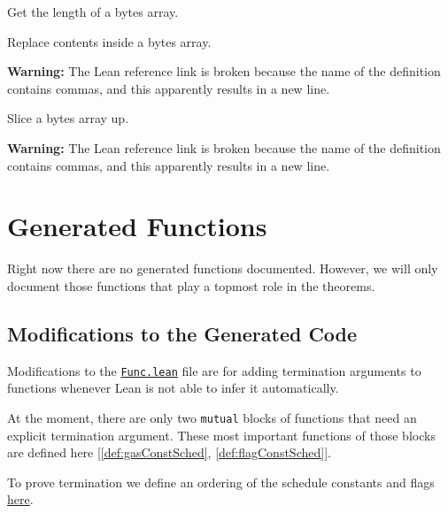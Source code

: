 \begin{definition}[lengthBytes]\label{def:lengthBytes}
\leanok{}
Get the length of a bytes array.
\end{definition}

\begin{definition}[replaceAtBytes]\label{def:replaceAtBytes}
\leanok{}
Replace contents inside a bytes array.

\textbf{Warning:} The Lean reference link is broken because the name of the
definition contains commas, and this apparently results in a new line.
\end{definition}

\begin{definition}[substrBytes]\label{def:substrBytes}
\leanok{}
Slice a bytes array up.

\textbf{Warning:} The Lean reference link is broken because the name of the
definition contains commas, and this apparently results in a new line.
\end{definition}

\section{Generated Functions}

Right now there are no generated functions documented. However, we will only document those functions that play a topmost role in the theorems.

\subsection{Modifications to the Generated Code}

Modifications to the
\href{https://runtimeverification.github.io/evm-equivalence/docs/EvmEquivalence/KEVM2Lean/Func.html}{\texttt{Func.lean}}
file are for adding termination arguments to functions whenever Lean is not able
to infer it automatically.

At the moment, there are only two \texttt{mutual} blocks of functions that need
an explicit termination argument. These most important functions of those blocks
are defined here [\ref{def:gasConstSched}, \ref{def:flagConstSched}].

To prove termination we define an ordering of the schedule constants and flags
\href{https://runtimeverification.github.io/evm-equivalence/docs/EvmEquivalence/KEVM2Lean/ScheduleOrdering.html}{here}.

